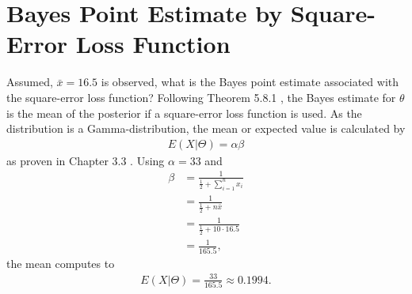 \section{Bayes Point Estimate by Square-Error Loss Function}
Assumed, $\bar{x} = 16.5$ is observed, what is the Bayes point estimate associated with the square-error loss function?
Following Theorem 5.8.1 \cite{larsen2005introduction}, the Bayes estimate for $\theta$ is the mean of the posterior if a square-error loss function is used. As the distribution is a Gamma-distribution, the mean or expected value is calculated by 
\begin{equation}
\begin{split}
E(X|\Theta) = \alpha\beta
\end{split}
\label{eq:expvalgamma}
\end{equation}
as proven in Chapter 3.3 \cite{hogg}. Using $\alpha = 33$ and 
\begin{equation}
\begin{split}
\beta &= \frac{1}{\frac{1}{2}+\sum_{i=1}^nx_i}\\
&=\frac{1}{\frac{1}{2}+n\bar{x}}\\
&=\frac{1}{\frac{1}{2}+10\cdot16.5}\\
&=\frac{1}{165.5},
\end{split}
\label{eq:postbeta}
\end{equation}
the mean computes to 
\begin{equation}
\begin{split}
E(X|\Theta) = \frac{33}{165.5} \approx 0.1994.
\end{split}
\label{eq:expvalgammacalc}
\end{equation}

